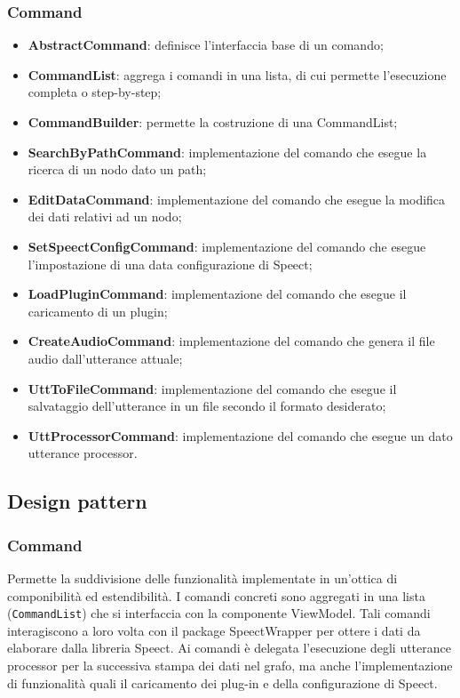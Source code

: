 \documentclass[openany,12pt,a4paper]{report}
\begin{document}
\subsubsection{Command}

\begin{itemize}
	\item \textbf{AbstractCommand}: definisce l'interfaccia base di un comando;
	\item \textbf{CommandList}: aggrega i comandi in una lista, di cui permette l'esecuzione completa o step-by-step;
	\item \textbf{CommandBuilder}: permette la costruzione di una CommandList;
	\item \textbf{SearchByPathCommand}: implementazione del comando che esegue la ricerca di un nodo dato un path;
	\item \textbf{EditDataCommand}: implementazione del comando che esegue la modifica dei dati relativi ad un nodo;
	\item \textbf{SetSpeectConfigCommand}: implementazione del comando che esegue l'impostazione di una data configurazione di Speect;
	\item \textbf{LoadPluginCommand}: implementazione del comando che esegue il caricamento di un plugin;
	\item \textbf{CreateAudioCommand}: implementazione del comando che genera il file audio dall'utterance attuale;
	\item \textbf{UttToFileCommand}: implementazione del comando che esegue il salvataggio dell'utterance in un file secondo il formato desiderato;
	\item \textbf{UttProcessorCommand}: implementazione del comando che esegue un dato utterance processor.
\end{itemize}

\newpage

\subsection{Design pattern}

\subsubsection{Command}
Permette la suddivisione delle funzionalità implementate in un'ottica di componibilità ed estendibilità. I comandi concreti sono aggregati in una lista (\verb|CommandList|) che si interfaccia con la componente ViewModel. Tali comandi interagiscono a loro volta con il package SpeectWrapper per ottere i dati da elaborare dalla libreria Speect. Ai comandi è delegata l'esecuzione degli utterance processor per la successiva stampa dei dati nel grafo, ma anche l'implementazione di funzionalità quali il caricamento dei \Gls{plug-in} e della configurazione di Speect.
\end{document}
